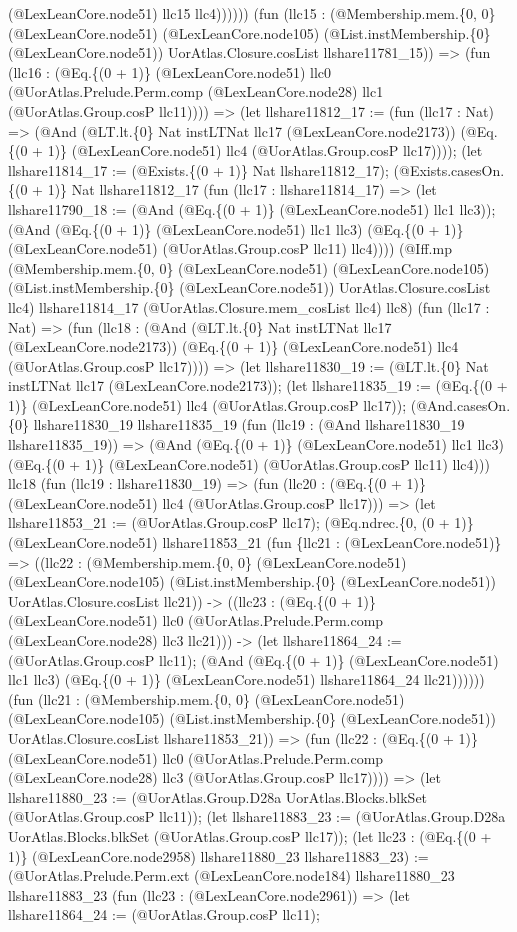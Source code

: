 \documentclass[11pt]{article}
\begin{document}
(@LexLeanCore.node51) llc15 llc4)))))) (fun (llc15 : (@Membership.mem.\{0, 0\} (@LexLeanCore.node51) (@LexLeanCore.node105) (@List.instMembership.\{0\} (@LexLeanCore.node51)) UorAtlas.Closure.cosList llshare11781\_15)) => (fun (llc16 : (@Eq.\{(0 + 1)\} (@LexLeanCore.node51) llc0 (@UorAtlas.Prelude.Perm.comp (@LexLeanCore.node28) llc1 (@UorAtlas.Group.cosP llc11)))) => (let llshare11812\_17 := (fun (llc17 : Nat) => (@And (@LT.lt.\{0\} Nat instLTNat llc17 (@LexLeanCore.node2173)) (@Eq.\{(0 + 1)\} (@LexLeanCore.node51) llc4 (@UorAtlas.Group.cosP llc17)))); (let llshare11814\_17 := (@Exists.\{(0 + 1)\} Nat llshare11812\_17); (@Exists.casesOn.\{(0 + 1)\} Nat llshare11812\_17 (fun (llc17 : llshare11814\_17) => (let llshare11790\_18 := (@And (@Eq.\{(0 + 1)\} (@LexLeanCore.node51) llc1 llc3)); (@And (@Eq.\{(0 + 1)\} (@LexLeanCore.node51) llc1 llc3) (@Eq.\{(0 + 1)\} (@LexLeanCore.node51) (@UorAtlas.Group.cosP llc11) llc4)))) (@Iff.mp (@Membership.mem.\{0, 0\} (@LexLeanCore.node51) (@LexLeanCore.node105) (@List.instMembership.\{0\} (@LexLeanCore.node51)) UorAtlas.Closure.cosList llc4) llshare11814\_17 (@UorAtlas.Closure.mem\_cosList llc4) llc8) (fun (llc17 : Nat) => (fun (llc18 : (@And (@LT.lt.\{0\} Nat instLTNat llc17 (@LexLeanCore.node2173)) (@Eq.\{(0 + 1)\} (@LexLeanCore.node51) llc4 (@UorAtlas.Group.cosP llc17)))) => (let llshare11830\_19 := (@LT.lt.\{0\} Nat instLTNat llc17 (@LexLeanCore.node2173)); (let llshare11835\_19 := (@Eq.\{(0 + 1)\} (@LexLeanCore.node51) llc4 (@UorAtlas.Group.cosP llc17)); (@And.casesOn.\{0\} llshare11830\_19 llshare11835\_19 (fun (llc19 : (@And llshare11830\_19 llshare11835\_19)) => (@And (@Eq.\{(0 + 1)\} (@LexLeanCore.node51) llc1 llc3) (@Eq.\{(0 + 1)\} (@LexLeanCore.node51) (@UorAtlas.Group.cosP llc11) llc4))) llc18 (fun (llc19 : llshare11830\_19) => (fun (llc20 : (@Eq.\{(0 + 1)\} (@LexLeanCore.node51) llc4 (@UorAtlas.Group.cosP llc17))) => (let llshare11853\_21 := (@UorAtlas.Group.cosP llc17); (@Eq.ndrec.\{0, (0 + 1)\} (@LexLeanCore.node51) llshare11853\_21 (fun \{llc21 : (@LexLeanCore.node51)\} => ((llc22 : (@Membership.mem.\{0, 0\} (@LexLeanCore.node51) (@LexLeanCore.node105) (@List.instMembership.\{0\} (@LexLeanCore.node51)) UorAtlas.Closure.cosList llc21)) -> ((llc23 : (@Eq.\{(0 + 1)\} (@LexLeanCore.node51) llc0 (@UorAtlas.Prelude.Perm.comp (@LexLeanCore.node28) llc3 llc21))) -> (let llshare11864\_24 := (@UorAtlas.Group.cosP llc11); (@And (@Eq.\{(0 + 1)\} (@LexLeanCore.node51) llc1 llc3) (@Eq.\{(0 + 1)\} (@LexLeanCore.node51) llshare11864\_24 llc21)))))) (fun (llc21 : (@Membership.mem.\{0, 0\} (@LexLeanCore.node51) (@LexLeanCore.node105) (@List.instMembership.\{0\} (@LexLeanCore.node51)) UorAtlas.Closure.cosList llshare11853\_21)) => (fun (llc22 : (@Eq.\{(0 + 1)\} (@LexLeanCore.node51) llc0 (@UorAtlas.Prelude.Perm.comp (@LexLeanCore.node28) llc3 (@UorAtlas.Group.cosP llc17)))) => (let llshare11880\_23 := (@UorAtlas.Group.D28a UorAtlas.Blocks.blkSet (@UorAtlas.Group.cosP llc11)); (let llshare11883\_23 := (@UorAtlas.Group.D28a UorAtlas.Blocks.blkSet (@UorAtlas.Group.cosP llc17)); (let llc23 : (@Eq.\{(0 + 1)\} (@LexLeanCore.node2958) llshare11880\_23 llshare11883\_23) := (@UorAtlas.Prelude.Perm.ext (@LexLeanCore.node184) llshare11880\_23 llshare11883\_23 (fun (llc23 : (@LexLeanCore.node2961)) => (let llshare11864\_24 := (@UorAtlas.Group.cosP llc11); 
\end{document}
